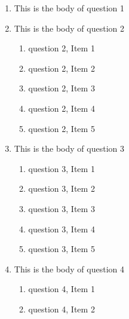 \documentclass{article}
\begin{document}
\begin{enumerate}

\item
This is the body of question 1

\item
This is the body of question 2

  \begin{enumerate}

    \item
    question 2, Item 1

    \item
    question 2, Item 2

    \item
    question 2, Item 3

    \item
    question 2, Item 4

    \item
    question 2, Item 5

  \end{enumerate}

\item
This is the body of question 3

  \begin{enumerate}

    \item
    question 3, Item 1

    \item
    question 3, Item 2

    \item
    question 3, Item 3

    \item
    question 3, Item 4

    \item
    question 3, Item 5

  \end{enumerate}

\item
This is the body of question 4

  \begin{enumerate}

    \item
    question 4, Item 1

    \item
    question 4, Item 2


\end{enumerate}
\end{enumerate}
\end{document}
